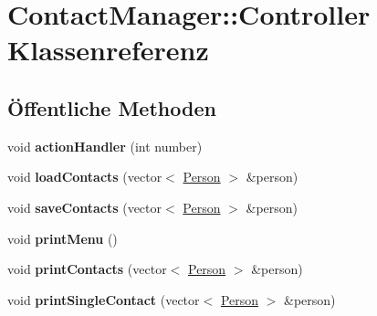 \hypertarget{classContactManager_1_1Controller}{}\section{Contact\+Manager\+:\+:Controller Klassenreferenz}
\label{classContactManager_1_1Controller}
\subsection*{Öffentliche Methoden}
\begin{DoxyCompactItemize}
\item 
\mbox{\label{classContactManager_1_1Controller_afd2e274df3edef5ab0abf90aae5ad21c}} 
void {\bfseries action\+Handler} (int number)
\item 
\mbox{\label{classContactManager_1_1Controller_aa10f0286519a294d96077af9eaa7b98c}} 
void {\bfseries load\+Contacts} (vector$<$ \hyperlink{classContactManager_1_1Person}{Person} $>$ \&person)
\item 
\mbox{\label{classContactManager_1_1Controller_a9e9c1932416993fd47fcf77601fa7974}} 
void {\bfseries save\+Contacts} (vector$<$ \hyperlink{classContactManager_1_1Person}{Person} $>$ \&person)
\item 
\mbox{\label{classContactManager_1_1Controller_ab36756f7c338b7f7d31fe74ad48f059d}} 
void {\bfseries print\+Menu} ()
\item 
\mbox{\label{classContactManager_1_1Controller_abd46b513b9d71e896fa3187e616aa805}} 
void {\bfseries print\+Contacts} (vector$<$ \hyperlink{classContactManager_1_1Person}{Person} $>$ \&person)
\item 
\mbox{\label{classContactManager_1_1Controller_ad56146eba96b0f1c4f535e978d75a0f2}} 
void {\bfseries print\+Single\+Contact} (vector$<$ \hyperlink{classContactManager_1_1Person}{Person} $>$ \&person)
\item 
\mbox{\label{classContactManager_1_1Controller_a6f5ce489625a26dc82f3473b63cc4336}} 

\end{DoxyCompactItemize}
